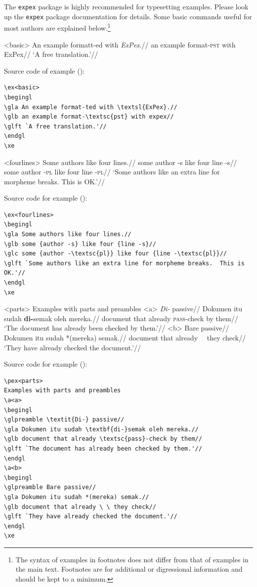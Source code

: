 \documentclass{nusaart}
\begin{document}
The \texttt{expex} package is highly recommended for typesetting examples.  Please look up the \texttt{expex} package documentation for details.  Some basic commands useful for most authors are explained below.\footnote{The syntax of examples in footnotes does not differ from that of examples in the main text.
\ex
Footnotes are for additional or digressional information and should be kept to a minimum.
\xe
}

\ex<basic>
\begingl
\gla An example formatt-ed with \textsl{ExPex}.//
\glb an example format-\textsc{pst} with ExPex//
\glft `A free translation.'//
\endgl
\xe

Source code of example ():
\begin{lstlisting}
\ex<basic>
\begingl
\gla An example format-ted with \textsl{ExPex}.//
\glb an example format-\textsc{pst} with expex//
\glft `A free translation.'//
\endgl
\xe
\end{lstlisting}

\ex<fourlines>
\begingl
\gla Some authors like four lines.//
\glb some {author -s} like four {line -s}//
\glc some {author -\textsc{pl}} like four {line -\textsc{pl}}//
\glft `Some authors like an extra line for morpheme breaks.  This is OK.'//
\endgl
\xe

Source code for example ():
\begin{lstlisting}
\ex<fourlines>
\begingl
\gla Some authors like four lines.//
\glb some {author -s} like four {line -s}//
\glc some {author -\textsc{pl}} like four {line -\textsc{pl}}//
\glft `Some authors like an extra line for morpheme breaks.  This is OK.'//
\endgl
\xe
\end{lstlisting}

\pex<parts>
Examples with parts and preambles
\a<a>
\begingl
\glpreamble \textit{Di-} passive//
\gla Dokumen itu sudah \textbf{di-}semak oleh mereka.//
\glb document that already \textsc{pass}-check by them//
\glft `The document has already been checked by them.'//
\endgl
\a<b>
\begingl
\glpreamble Bare passive//
\gla Dokumen itu sudah *(mereka) semak.//
\glb document that already \ \ they check//
\glft `They have already checked the document.'//
\endgl
\xe

Source code for example ():
\begin{lstlisting}
\pex<parts>
Examples with parts and preambles
\a<a>
\begingl
\glpreamble \textit{Di-} passive//
\gla Dokumen itu sudah \textbf{di-}semak oleh mereka.//
\glb document that already \textsc{pass}-check by them//
\glft `The document has already been checked by them.'//
\endgl
\a<b>
\begingl
\glpreamble Bare passive//
\gla Dokumen itu sudah *(mereka) semak.//
\glb document that already \ \ they check//
\glft `They have already checked the document.'//
\endgl
\xe
\end{lstlisting}
\end{document}
